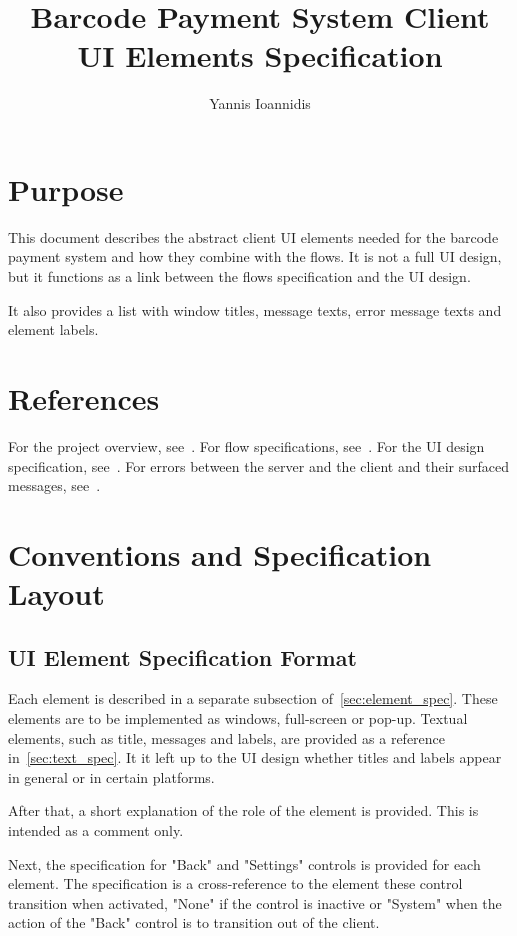 \documentclass[a4paper,10pt]{article}
\title{Barcode Payment System Client UI Elements Specification}
\author{Yannis Ioannidis}
\begin{document}
\maketitle
\tableofcontents

\section{Purpose}
This document describes the abstract client UI elements needed for the barcode 
payment system and how they combine with the flows. It is not a full UI design, 
but it functions as a link between the flows specification and the UI design.

It also provides a list with window titles, message texts, error message texts 
and element labels.

\section{References}
For the project overview, see~\cite{project_spec}. For flow specifications, 
see~\cite{flow_spec}. For the UI design specification, 
see~\cite{UI_design_spec}. For errors between the server and the client and 
their surfaced messages, see~\cite{error_code_spec}.

\section{Conventions and Specification Layout}

\subsection{UI Element Specification Format}
Each element is described in a separate subsection of~\ref{sec:element_spec}. 
These elements are to be implemented as windows, full-screen or pop-up. Textual 
elements, such as title, messages and labels, are provided as a reference 
in~\ref{sec:text_spec}. It it left up to the UI design whether titles and labels 
appear in general or in certain platforms.

After that, a short explanation of the role of the element is provided. This is 
intended as a comment only.

Next, the specification for "Back" and "Settings" controls is provided for 
each element. The specification is a cross-reference to the element these 
control transition when activated, "None" if the control is inactive or 
"System" 
when the action of the "Back" control is to transition out of the client.
\end{document}
